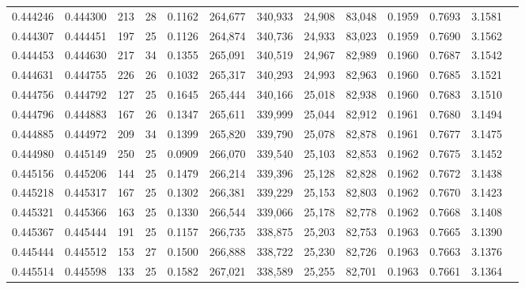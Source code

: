 \begin{tabular}{rrrrrrrrrrrrr}
0.444246 & 0.444300 & 213 &  28 &                                     0.1162 & 264,677 & 340,933 &  24,908 &  83,048 & 0.1959 & 0.7693 & 3.1581 \\
0.444307 & 0.444451 & 197 &  25 &                                     0.1126 & 264,874 & 340,736 &  24,933 &  83,023 & 0.1959 & 0.7690 & 3.1562 \\
0.444453 & 0.444630 & 217 &  34 &                                     0.1355 & 265,091 & 340,519 &  24,967 &  82,989 & 0.1960 & 0.7687 & 3.1542 \\
0.444631 & 0.444755 & 226 &  26 &                                     0.1032 & 265,317 & 340,293 &  24,993 &  82,963 & 0.1960 & 0.7685 & 3.1521 \\
0.444756 & 0.444792 & 127 &  25 &                                     0.1645 & 265,444 & 340,166 &  25,018 &  82,938 & 0.1960 & 0.7683 & 3.1510 \\
0.444796 & 0.444883 & 167 &  26 &                                     0.1347 & 265,611 & 339,999 &  25,044 &  82,912 & 0.1961 & 0.7680 & 3.1494 \\
0.444885 & 0.444972 & 209 &  34 &                                     0.1399 & 265,820 & 339,790 &  25,078 &  82,878 & 0.1961 & 0.7677 & 3.1475 \\
0.444980 & 0.445149 & 250 &  25 &                                     0.0909 & 266,070 & 339,540 &  25,103 &  82,853 & 0.1962 & 0.7675 & 3.1452 \\
0.445156 & 0.445206 & 144 &  25 &                                     0.1479 & 266,214 & 339,396 &  25,128 &  82,828 & 0.1962 & 0.7672 & 3.1438 \\
0.445218 & 0.445317 & 167 &  25 &                                     0.1302 & 266,381 & 339,229 &  25,153 &  82,803 & 0.1962 & 0.7670 & 3.1423 \\
0.445321 & 0.445366 & 163 &  25 &                                     0.1330 & 266,544 & 339,066 &  25,178 &  82,778 & 0.1962 & 0.7668 & 3.1408 \\
0.445367 & 0.445444 & 191 &  25 &                                     0.1157 & 266,735 & 338,875 &  25,203 &  82,753 & 0.1963 & 0.7665 & 3.1390 \\
0.445444 & 0.445512 & 153 &  27 &                                     0.1500 & 266,888 & 338,722 &  25,230 &  82,726 & 0.1963 & 0.7663 & 3.1376 \\
0.445514 & 0.445598 & 133 &  25 &                                     0.1582 & 267,021 & 338,589 &  25,255 &  82,701 & 0.1963 & 0.7661 & 3.1364 \\

\end{tabular}
